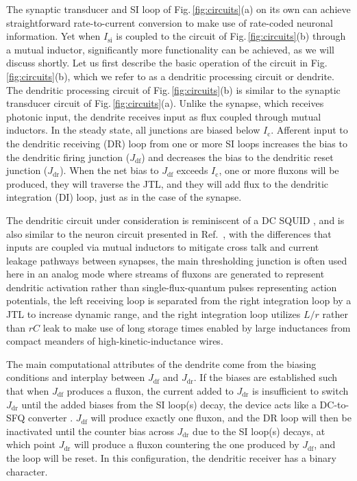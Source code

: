 \documentclass[twocolumn]{article}
\newcommand{\onlinecite}[1]{\hspace{-1 ex} \nocite{#1}\citenum{#1}}
\begin{document}
The synaptic transducer and SI loop of Fig.\,\ref{fig:circuits}(a) on its own can achieve straightforward rate-to-current conversion to make use of rate-coded neuronal information. Yet when $I_{\mathrm{si}}$ is coupled to the circuit of Fig.\,\ref{fig:circuits}(b) through a mutual inductor, significantly more functionality can be achieved, as we will discuss shortly. Let us first describe the basic operation of the circuit in Fig.\,\ref{fig:circuits}(b), which we refer to as a dendritic processing circuit or dendrite. The dendritic processing circuit of Fig.\,\ref{fig:circuits}(b) is similar to the synaptic transducer circuit of Fig.\,\ref{fig:circuits}(a). Unlike the synapse, which receives photonic input, the dendrite receives input as flux coupled through mutual inductors. In the steady state, all junctions are biased below $I_{\mathrm{c}}$. Afferent input to the dendritic receiving (DR) loop from one or more SI loops increases the bias to the dendritic firing junction ($J_{\mathrm{df}}$) and decreases the bias to the dendritic reset junction ($J_{\mathrm{dr}}$). When the net bias to $J_{\mathrm{df}}$ exceeds $I_{\mathrm{c}}$, one or more fluxons will be produced, they will traverse the JTL, and they will add flux to the dendritic integration (DI) loop, just as in the case of the synapse. 

The dendritic circuit under consideration is reminiscent of a DC SQUID \cite{vatu1998,ka1999}, and is also similar to the neuron circuit presented in Ref.\,\onlinecite{crsc2010}, with the differences that inputs are coupled via mutual inductors to mitigate cross talk and current leakage pathways between synapses, the main thresholding junction is often used here in an analog mode where streams of fluxons are generated to represent dendritic activation rather than single-flux-quantum pulses representing action potentials, the left receiving loop is separated from the right integration loop by a JTL to increase dynamic range, and the right integration loop utilizes $L/r$ rather than $rC$ leak to make use of long storage times enabled by large inductances from compact meanders of high-kinetic-inductance wires.

The main computational attributes of the dendrite come from the biasing conditions and interplay between $J_{\mathrm{df}}$ and $J_{\mathrm{dr}}$. If the biases are established such that when $J_{\mathrm{df}}$ produces a fluxon, the current added to $J_{\mathrm{dr}}$ is insufficient to switch $J_{\mathrm{dr}}$ until the added biases from the SI loop(s) decay, the device acts like a DC-to-SFQ converter \cite{vatu1998,ka1999}. $J_{\mathrm{df}}$ will produce exactly one fluxon, and the DR loop will then be inactivated until the counter bias across $J_{\mathrm{dr}}$ due to the SI loop(s) decays, at which point $J_{\mathrm{dr}}$ will produce a fluxon countering the one produced by $J_{\mathrm{df}}$, and the loop will be reset. In this configuration, the dendritic receiver has a binary character.
\end{document}
